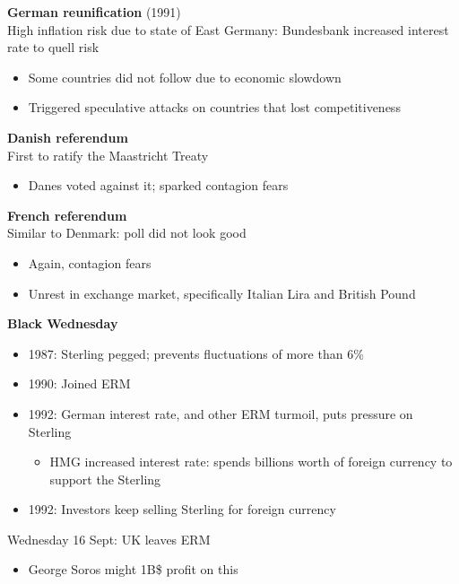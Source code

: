 \documentclass{beamer}
\begin{document}
\begin{frame}
  \textbf{German reunification} (1991)\\
    High inflation risk due to state of East Germany: Bundesbank increased interest rate to quell risk
    \begin{itemize}
      \item Some countries did not follow due to economic slowdown
      \item Triggered speculative attacks on countries that lost competitiveness
    \end{itemize}
\end{frame}

\begin{frame}
 \textbf{Danish referendum}\\
   First to ratify the Maastricht Treaty
   \begin{itemize}
     \item Danes voted against it; sparked contagion fears     
   \end{itemize}
   \medskip
   \textbf{French referendum}\\
   Similar to Denmark: poll did not look good
   \begin{itemize}
     \item Again, contagion fears
     \item Unrest in exchange market, specifically Italian Lira and British Pound
   \end{itemize}
\end{frame}

\begin{frame}
  \textbf{Black Wednesday}
  \begin{itemize}
    \item 1987: Sterling pegged; prevents fluctuations of more than 6\%
    \item 1990: Joined ERM
    \item 1992: German interest rate, and other ERM turmoil, puts pressure on Sterling
    \begin{itemize}
      \item HMG increased interest rate: spends billions worth of foreign currency to support the Sterling
    \end{itemize}
    \item 1992: Investors keep selling Sterling for foreign currency
  \end{itemize}
  \medskip
  Wednesday 16 Sept: UK leaves ERM
  \begin{itemize}
    \item George Soros might 1B\$ profit on this
  \end{itemize}
\end{frame}
\end{document}
